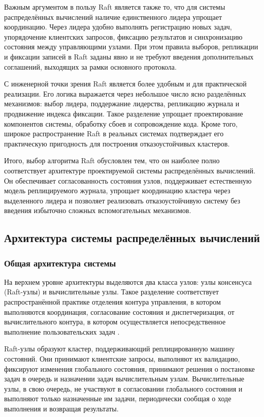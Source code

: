 Важным аргументом в пользу Raft является также то, что для системы
распределённых вычислений наличие единственного лидера упрощает координацию.
Через лидера удобно выполнять регистрацию новых задач, упорядочение клиентских
запросов, фиксацию результатов и синхронизацию состояния между управляющими
узлами. При этом правила выборов, репликации и фиксации записей в Raft заданы
явно и не требуют введения дополнительных соглашений, выходящих за рамки
основного протокола.

С инженерной точки зрения Raft является более удобным и для практической
реализации. Его логика выражается через небольшое число ясно разделённых
механизмов: выбор лидера, поддержание лидерства, репликацию журнала и
продвижение индекса фиксации. Такое разделение упрощает проектирование
компонентов системы, обработку сбоев и сопровождение кода. Кроме того, широкое
распространение Raft в реальных системах подтверждает его практическую
пригодность для построения отказоустойчивых кластеров.

Итого, выбор алгоритма Raft обусловлен тем, что он наиболее полно соответствует
архитектуре проектируемой системы распределённых вычислений. Он обеспечивает
согласованность состояния узлов, поддерживает естественную модель
реплицируемого журнала, упрощает координацию кластера через выделенного лидера
и позволяет реализовать отказоустойчивую систему без введения избыточно сложных
вспомогательных механизмов.

\subsection{Архитектура системы распределённых вычислений}

\subsubsection{Общая архитектура системы}

На верхнем уровне архитектуры выделяются два класса узлов: узлы
консенсуса (Raft-узлы) и вычислительные узлы. Такое разделение
соответствует распространённой практике отделения контура управления, в котором
выполняются координация, согласование состояния и диспетчеризация, от
вычислительного контура, в котором осуществляется непосредственное выполнение
пользовательских задач \cite{coulouris2012}.

Raft-узлы образуют кластер, поддерживающий реплицированную машину
состояний. Они принимают клиентские запросы, выполняют их валидацию,
фиксируют изменения глобального состояния, принимают решения о постановке
задач в очередь и назначении задач вычислительным узлам. Вычислительные
узлы, в свою очередь, не участвуют в согласовании глобального состояния и
выполняют только назначенные им задачи, периодически сообщая о ходе
выполнения и возвращая результаты.

